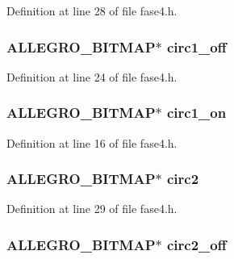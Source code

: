 Definition at line 28 of file fase4.\-h.

\hypertarget{struct_level_quatro_a61973bafd11ab9dea9306731297f4728}{
\subsubsection[{circ1\-\_\-off}]{\setlength{\rightskip}{0pt plus 5cm}A\-L\-L\-E\-G\-R\-O\-\_\-\-B\-I\-T\-M\-A\-P$\ast$ circ1\-\_\-off}}\label{struct_level_quatro_a61973bafd11ab9dea9306731297f4728}


Definition at line 24 of file fase4.\-h.

\hypertarget{struct_level_quatro_a15699608afb18fad793848cd8fd32fe0}{
\subsubsection[{circ1\-\_\-on}]{\setlength{\rightskip}{0pt plus 5cm}A\-L\-L\-E\-G\-R\-O\-\_\-\-B\-I\-T\-M\-A\-P$\ast$ circ1\-\_\-on}}\label{struct_level_quatro_a15699608afb18fad793848cd8fd32fe0}


Definition at line 16 of file fase4.\-h.

\hypertarget{struct_level_quatro_a1b8836cb8a00a286c87bfbafdacbd03d}{
\subsubsection[{circ2}]{\setlength{\rightskip}{0pt plus 5cm}A\-L\-L\-E\-G\-R\-O\-\_\-\-B\-I\-T\-M\-A\-P$\ast$ circ2}}\label{struct_level_quatro_a1b8836cb8a00a286c87bfbafdacbd03d}


Definition at line 29 of file fase4.\-h.

\hypertarget{struct_level_quatro_a384448f3d672f70b70b1bf454cb46e50}{
\subsubsection[{circ2\-\_\-off}]{\setlength{\rightskip}{0pt plus 5cm}A\-L\-L\-E\-G\-R\-O\-\_\-\-B\-I\-T\-M\-A\-P$\ast$ circ2\-\_\-off}}\label{struct_level_quatro_a384448f3d672f70b70b1bf454cb46e50}


